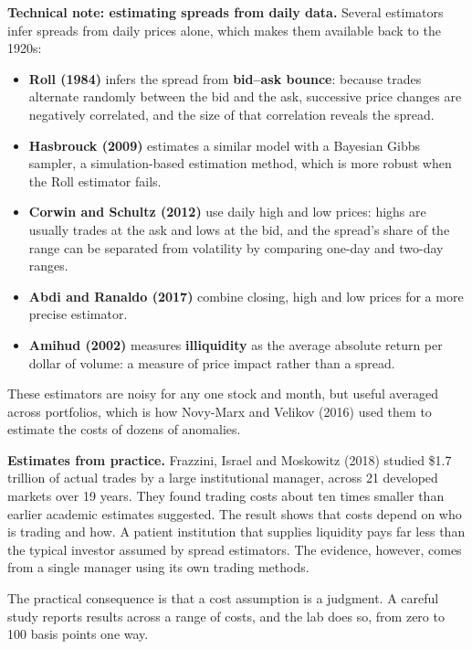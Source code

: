 \begin{technote}
\textbf{Technical note: estimating spreads from daily data.} Several estimators infer spreads from daily prices alone, which makes them available back to the 1920s:

\begin{itemize}
  \item \textbf{Roll (1984)} infers the spread from \textbf{bid--ask bounce}: because trades alternate randomly between the bid and the ask, successive price changes are negatively correlated, and the size of that correlation reveals the spread.
  \item \textbf{Hasbrouck (2009)} estimates a similar model with a Bayesian Gibbs sampler, a simulation-based estimation method, which is more robust when the Roll estimator fails.
  \item \textbf{Corwin and Schultz (2012)} use daily high and low prices: highs are usually trades at the ask and lows at the bid, and the spread's share of the range can be separated from volatility by comparing one-day and two-day ranges.
  \item \textbf{Abdi and Ranaldo (2017)} combine closing, high and low prices for a more precise estimator.
  \item \textbf{Amihud (2002)} measures \textbf{illiquidity} as the average absolute return per dollar of volume: a measure of price impact rather than a spread.
\end{itemize}

These estimators are noisy for any one stock and month, but useful averaged across portfolios, which is how Novy-Marx and Velikov (2016) used them to estimate the costs of dozens of anomalies.
\end{technote}

\textbf{Estimates from practice.} Frazzini, Israel and Moskowitz (2018) studied \$1.7 trillion of actual trades by a large institutional manager, across 21 developed markets over 19 years. They found trading costs about ten times smaller than earlier academic estimates suggested. The result shows that costs depend on who is trading and how. A patient institution that supplies liquidity pays far less than the typical investor assumed by spread estimators. The evidence, however, comes from a single manager using its own trading methods.

The practical consequence is that a cost assumption is a judgment. A careful study reports results across a range of costs, and the lab does so, from zero to 100 basis points one way.

